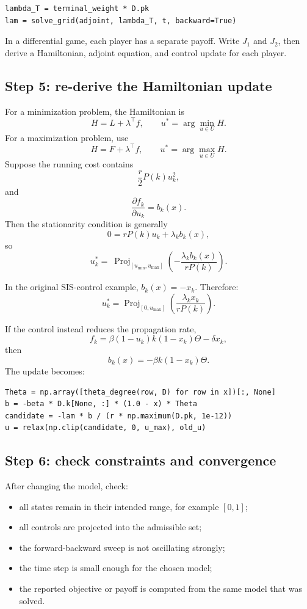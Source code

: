 \documentclass[11pt,a4paper]{article}
\newcommand{\Proj}{\operatorname{Proj}}
\begin{document}
\begin{lstlisting}[style=py]
lambda_T = terminal_weight * D.pk
lam = solve_grid(adjoint, lambda_T, t, backward=True)
\end{lstlisting}

In a differential game, each player has a separate payoff. Write \(J_1\) and \(J_2\), then derive a Hamiltonian, adjoint equation, and control update for each player.

\subsection{Step 5: re-derive the Hamiltonian update}

For a minimization problem, the Hamiltonian is
\[
  H=L+\lambda^\top f,
  \qquad
  u^*=\arg\min_{u\in U}H.
\]
For a maximization problem, use
\[
  H=F+\lambda^\top f,
  \qquad
  u^*=\arg\max_{u\in U}H.
\]
Suppose the running cost contains
\[
  \frac{r}{2}P(k)u_k^2,
\]
and
\[
  \frac{\partial f_k}{\partial u_k}=b_k(x).
\]
Then the stationarity condition is generally
\[
  0=rP(k)u_k+\lambda_k b_k(x),
\]
so
\[
  u_k^*=\
  \Proj_{[u_{\min},u_{\max}]}
  \left(-\frac{\lambda_k b_k(x)}{rP(k)}\right).
\]

In the original SIS-control example, \(b_k(x)=-x_k\). Therefore:
\[
  u_k^*=
  \Proj_{[0,u_{\max}]}
  \left(\frac{\lambda_kx_k}{rP(k)}\right).
\]

If the control instead reduces the propagation rate,
\[
  f_k=\beta(1-u_k)k(1-x_k)\Theta-\delta x_k,
\]
then
\[
  b_k(x)=-\beta k(1-x_k)\Theta.
\]
The update becomes:

\begin{lstlisting}[style=py]
Theta = np.array([theta_degree(row, D) for row in x])[:, None]
b = -beta * D.k[None, :] * (1.0 - x) * Theta
candidate = -lam * b / (r * np.maximum(D.pk, 1e-12))
u = relax(np.clip(candidate, 0, u_max), old_u)
\end{lstlisting}

\subsection{Step 6: check constraints and convergence}

After changing the model, check:

\begin{itemize}
  \item all states remain in their intended range, for example \([0,1]\);
  \item all controls are projected into the admissible set;
  \item the forward-backward sweep is not oscillating strongly;
  \item the time step is small enough for the chosen model;
  \item the reported objective or payoff is computed from the same model that was solved.
\end{itemize}
\end{document}
